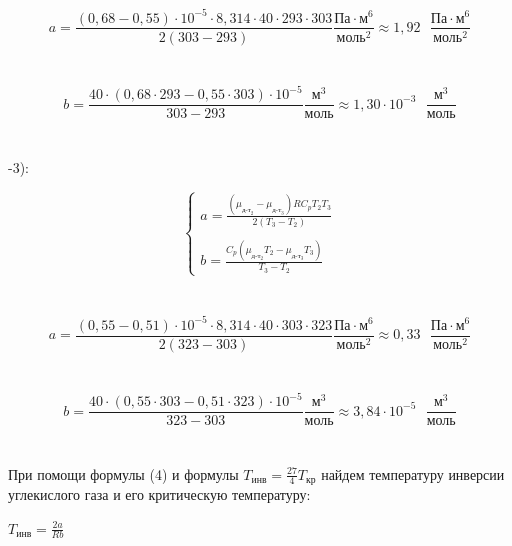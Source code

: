 \documentclass[a4paper, 12pt]{article}
\begin{document}
\begin{enumerate}
\begin{equation*}
	a = \frac{(0,68 - 0,55)\cdot 10^{-5} \cdot 8,314 \cdot 40 \cdot 293 \cdot 303}{2(303 - 293)}\frac{\text{Па}\cdot \text{м}^6}{\text{моль}^2} \approx 1,92 \text{ }\frac{\text{Па}\cdot \text{м}^6}{\text{моль}^2}
\end{equation*}
\\
\\
\begin{equation*}
		b = \frac{40 \cdot (0,68 \cdot 293 - 0,55 \cdot 303) \cdot 10^{-5}}{303 - 293}\frac{\text{м}^3}{\text{моль}} \approx 1,30 \cdot 10^{-3}\text{ }\frac{\text{м}^3}{\text{моль}}
\end{equation*}
\\
\\
-3):

\begin{equation*}
	\begin{cases}
		a = \frac{(\mu_{\text{д-т}_{2}} - \mu_{\text{д-т}_{3}})RC_{p}T_{2}T_{3}}{2(T_{3} - T_{2})}
		\\
		\\
		b = \frac{C_{p}(\mu_{\text{д-т}_{2}}T_{2} - \mu_{\text{д-т}_{3}}T_{3})}{T_{3} - T_{2}}
	\end{cases}
\end{equation*}
\\
\\

\begin{equation*}
	a = \frac{(0,55 - 0,51)\cdot 10^{-5} \cdot 8,314 \cdot 40 \cdot 303 \cdot 323}{2(323 - 303)}\frac{\text{Па}\cdot \text{м}^6}{\text{моль}^2} \approx 0,33 \text{ }\frac{\text{Па}\cdot \text{м}^6}{\text{моль}^2}
\end{equation*}
\\
\\
\begin{equation*}
	b = \frac{40 \cdot (0,55 \cdot 303 - 0,51 \cdot 323) \cdot 10^{-5}}{323 - 303}\frac{\text{м}^3}{\text{моль}} \approx 3,84 \cdot 10^{-5}\text{ }\frac{\text{м}^3}{\text{моль}}
\end{equation*}
\\
\\
При помощи формулы (4) и формулы $T_{\text{инв}} = \frac{27}{4}T_{\text{кр}}$ найдем температуру инверсии углекислого газа и его критическую температуру:

$T_{\text{инв}} = \frac{2a}{Rb}$

\vspace{3mm}


\end{enumerate}
\end{document}
